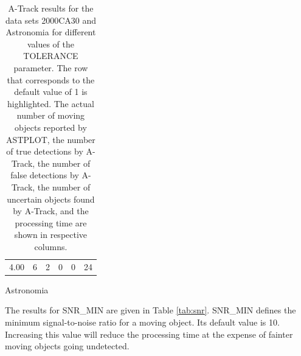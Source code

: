 \documentclass[review]{elsarticle}
\begin{document}
\begin{table}[H]
\begin{subtable}[h]{0.45\textwidth}
{\begin{tabular}{@{}>{\Large}c>{\Large}c>{\Large}c>{\Large}c>{\Large}c>{\Large}c@{}}
		 4.00 & 6 & 2 & 0 & 0 & 24
        \end{tabular}
        }
        \caption{Astronomia}
        \label{tab:astronomia_tolerance}
    \end{subtable}
    \caption{A-Track results for the data sets 2000CA30 and Astronomia for different values of the TOLERANCE parameter. The row that corresponds to the default value of 1 is highlighted. The actual number of moving objects reported by ASTPLOT, the number of true detections by A-Track, the number of false detections by A-Track, the number of uncertain objects found by A-Track, and the processing time are shown in respective columns.}
    \label{tab:tau}
\end{table}

The results for SNR\_MIN are given in Table \ref{tab:snr}. SNR\_MIN defines the minimum signal-to-noise ratio for a moving object. Its default value is 10. Increasing this value will reduce the processing time at the expense of fainter moving objects going undetected.
\end{document}
